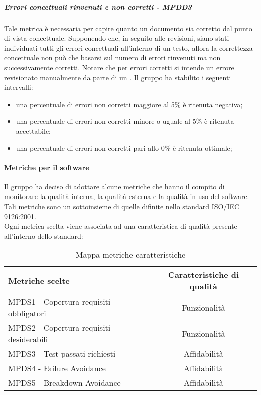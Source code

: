 \documentclass[PianoDiQualifica.tex]{subfiles}
\begin{document}
				\hypertarget{err_concettuali}{\subparagraph{Errori concettuali rinvenuti e non corretti - MPDD3}}
				Tale metrica è necessaria per capire quanto un documento sia corretto dal punto di vista concettuale. Supponendo che, in seguito alle revisioni,
				siano stati individuati tutti gli errori concettuali all’interno di un testo, allora la correttezza concettuale non può che basarsi
				sul numero di errori rinvenuti ma non successivamente corretti. Notare che per errori corretti si intende un errore revisionato manualmente da parte
				di un \VER{}.
				Il gruppo ha stabilito i seguenti intervalli:
				\begin{itemize}
					\item una percentuale di errori non corretti maggiore al 5\% è ritenuta negativa;
					\item una percentuale di errori non corretti minore o uguale al 5\% è ritenuta accettabile;
					\item una percentuale di errori non corretti pari allo 0\% è ritenuta ottimale;
				\end{itemize}
				
			\paragraph{Metriche per il software}
			Il gruppo \GRUPPO{} ha deciso di adottare alcune metriche che hanno il compito di monitorare la qualità interna, la qualità esterna e
			la qualità in uso del software. Tali metriche sono un sottoinsieme di quelle difinite nello standard ISO/IEC 9126:2001. \\
			Ogni metrica scelta viene associata ad una caratteristica di qualità presente all’interno dello standard: \\
			\begin{table}[h]
				\centering
				\begin{tabular}{l c}
					\hline
					\rule[-0.3cm]{0cm}{0.8cm}
					\textbf{Metriche scelte} & \textbf{Caratteristiche di qualità} \\
					\hline
					\rule[0cm]{0cm}{0.4cm}
					MPDS1 - Copertura requisiti obbligatori & Funzionalità \\
					\rule[0cm]{0cm}{0.4cm}
					MPDS2 - Copertura requisiti desiderabili & Funzionalità \\
					\rule[0cm]{0cm}{0.4cm}
					MPDS3 - Test passati richiesti & Affidabilità \\
					\rule[0cm]{0cm}{0.4cm}
					MPDS4 - Failure Avoidance & Affidabilità \\
					\rule[0cm]{0cm}{0.4cm}
					MPDS5 - Breakdown Avoidance & Affidabilità \\
					\hline
				\end{tabular}
				\caption{Mappa metriche-caratteristiche}
			\end{table}
			
\end{document}
